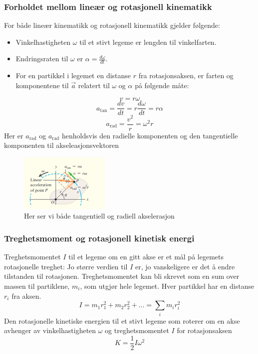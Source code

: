 \subsubsection{Forholdet mellom lineær og rotasjonell kinematikk}
For både lineær kinematikk og rotasjonell kinematikk gjelder følgende:\newline\newline
\begin{itemize}
    \item Vinkelhastigheten $\omega$ til et stivt legeme er lengden til vinkelfarten.
    \item Endringsraten til $\omega$ er $\alpha=\frac{d\omega}{dt}.$
    \item For en partikkel i legemet en distanse $r$ fra rotasjonsaksen, er farten og komponentene til $\vec{a}$ relatert til $\omega$ og $\alpha$ på følgende måte:
\end{itemize}
\begin{equation}
    v=r\omega
\end{equation}
\begin{equation}
    a_{\text{tan}}=\frac{dv}{dt}=r\frac{d\omega}{dt}=r\alpha
\end{equation}
\begin{equation}
    a_{\text{rad}}=\frac{v^2}{r}=\omega^2r
\end{equation}
Her er $a_\text{rad}$ og $a_\text{rad}$ henholdsvis den radielle komponenten og den tangentielle komponenten til akseleasjonsvektoren \cite{FYSIKK:1}
\begin{figure}[!ht]
\begin{center}
\includegraphics{rapport/teori/bilder/tang.png}
\caption{Her ser vi både tangentiell og radiell akselerasjon}
\label{fig:rotasjon}
\end{center}
\end{figure}

\subsubsection{Treghetsmoment og rotasjonell kinetisk energi}
Treghetsmomentet $I$ til et legeme om en gitt akse er et mål på legemets rotasjonelle treghet: Jo større verdien til $I$ er, jo vanskeligere er det å endre tilstanden til rotasjonen. Treghetsmomentet kan bli skrevet som en sum over massen til partiklene, $m_i$, som utgjør hele legemet. Hver partikkel har en distanse $r_i$ fra aksen.
\begin{equation}
    I=m_1r_1^2+m_2r_2^2+\dots=\sum_i{m_{i}r_i^2}
\end{equation}
Den rotasjonelle kinetiske energien til et stivt legeme som roterer om en akse avhenger av vinkelhastigheten $\omega$ og treghetsmomentet $I$ for rotasjonsaksen
\begin{equation}
    K=\frac{1}{2}I\omega^2
\end{equation}
